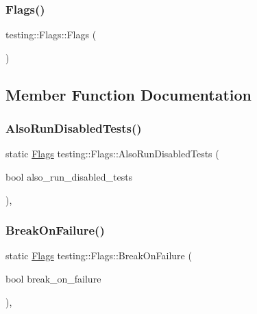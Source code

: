 \subsubsection{\texorpdfstring{Flags()}{Flags()}}
{\footnotesize\ttfamily testing\+::\+Flags\+::\+Flags (\begin{DoxyParamCaption}{ }\end{DoxyParamCaption})\hspace{0.3cm}{\ttfamily [inline]}}



\subsection{Member Function Documentation}
\mbox{\label{structtesting_1_1_flags_a8bee2b5f94d8248b6791d6b005db146f}} 
\subsubsection{\texorpdfstring{Also\+Run\+Disabled\+Tests()}{AlsoRunDisabledTests()}}
{\footnotesize\ttfamily static \hyperlink{structtesting_1_1_flags}{Flags} testing\+::\+Flags\+::\+Also\+Run\+Disabled\+Tests (\begin{DoxyParamCaption}\item[{bool}]{also\+\_\+run\+\_\+disabled\+\_\+tests }\end{DoxyParamCaption})\hspace{0.3cm}{\ttfamily [inline]}, {\ttfamily [static]}}

\mbox{\label{structtesting_1_1_flags_a62660e44922321f7640bc951a04c2296}} 
\subsubsection{\texorpdfstring{Break\+On\+Failure()}{BreakOnFailure()}}
{\footnotesize\ttfamily static \hyperlink{structtesting_1_1_flags}{Flags} testing\+::\+Flags\+::\+Break\+On\+Failure (\begin{DoxyParamCaption}\item[{bool}]{break\+\_\+on\+\_\+failure }\end{DoxyParamCaption})\hspace{0.3cm}{\ttfamily [inline]}, {\ttfamily [static]}}

